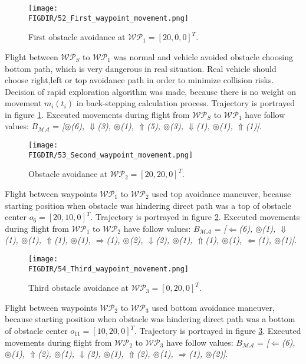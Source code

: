 \begin{figure}[H]
    \centering
    \texttt{[image: \\FIGDIR/52\_First\_waypoint\_movement.png]}
    \caption{First obstacle avoidance at $\mathscr{WP}_1=[20,0,0]^T$.}
    \label{fig:52firstObstacleKnown}
\end{figure}
\noindent Flight between $\mathscr{WP}_S$ to $\mathscr{WP}_1$ was normal and vehicle avoided obstacle choosing bottom path, which is very dangerous in real situation. Real vehicle should choose right,left or top avoidance path in order to minimize collision risks. Decision of rapid exploration algorithm was made, because there is no weight on movement $m_i(t_i)$ in back-stepping calculation process. Trajectory is portrayed in figure \ref{fig:52firstObstacleKnown}. Executed movements during flight from $\mathscr{WP}_S$ to $\mathscr{WP}_1$ have follow values: $B_{\mathscr{MA}}$ = \textit{[$\circledcirc$(6), $\Downarrow$(3), $\circledcirc$(1), $\Uparrow$(5), $\circledcirc$(3), $\Downarrow$(1), $\circledcirc$(1), $\Uparrow$(1)]}. 
\begin{figure}[H]
    \centering
    \texttt{[image: \\FIGDIR/53\_Second\_waypoint\_movement.png]}
    \caption{Obstacle avoidance at $\mathscr{WP}_2=[20,20,0]^T$.}
    \label{fig:53secondObstacleKnown}
\end{figure}
\noindent Flight between waypoints $\mathscr{WP}_1$ to $\mathscr{WP}_2$ used top avoidance maneuver, because starting position when obstacle was hindering direct path was a top of obstacle center $o_6=[20,10,0]^T$. Trajectory is portrayed in figure \ref{fig:53secondObstacleKnown}. Executed movements during flight from $\mathscr{WP}_1$ to $\mathscr{WP}_2$ have follow values: $B_{\mathscr{MA}}$ = \textit{[$\Leftarrow$(6), $\circledcirc$(1), $\Downarrow$(1), $\circledcirc$(1), $\Uparrow$(1), $\circledcirc$(1), $\Rightarrow$(1), $\circledcirc$(2), $\Downarrow$(2), $\circledcirc$(1), $\Uparrow$(1), $\circledcirc$(1), $\Leftarrow$(1), $\circledcirc$(1)]}.
\begin{figure}[H]
    \centering
    \texttt{[image: \\FIGDIR/54\_Third\_waypoint\_movement.png]}
    \caption{Third obstacle avoidance at $\mathscr{WP}_3=[0,20,0]^T$.}
    \label{fig:54thirdObstacleKnown}
\end{figure}
\noindent Flight between waypoints $\mathscr{WP}_2$ to $\mathscr{WP}_3$ used bottom avoidance maneuver, because starting position when obstacle was hindering direct path was a bottom of obstacle center $o_{11}=[10,20,0]^T$. Trajectory is portrayed in figure \ref{fig:54thirdObstacleKnown}. Executed movements during flight from $\mathscr{WP}_2$ to $\mathscr{WP}_3$ have follow values: $B_{\mathscr{MA}}$ = \textit{[$\Leftarrow$(6), $\circledcirc$(1), $\Uparrow$(2), $\circledcirc$(1), $\Downarrow$(2), $\circledcirc$(1), $\Uparrow$(2), $\circledcirc$(1), $\Rightarrow$(1), $\circledcirc$(2)]}.
